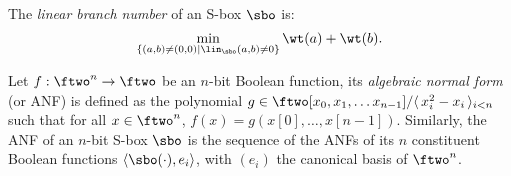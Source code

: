 \begin{defi}
The \emph{linear branch number} of an S-box $\sbo$ is:
\[
\min_{\{(a,b) \neq (0,0) | \lin_{\sbo}(a,b) \neq 0\}} \wt(a) + \wt(b).
\]

\end{defi}

\begin{defi}
Let $f : \ftwo^n \rightarrow \ftwo$ be an $n$-bit Boolean function, its \emph{algebraic normal form}
(or ANF) is defined as the polynomial $g \in \ftwo[x_0,x_1,\ldots x_{n-1}]/\langle\,x_i^2-x_i\,\rangle_{i<n}$
such that for all $x \in \ftwo^n$, $f(x) = g(x[0],\ldots,\allowbreak x[n-1])$.
Similarly, the ANF of an $n$-bit S-box $\sbo$ 
is the sequence of the ANFs of its $n$ constituent Boolean
functions $\langle\sbo(\cdot),e_i\rangle$, with $(e_i)$ the canonical basis of $\ftwo^n$.
\end{defi}
